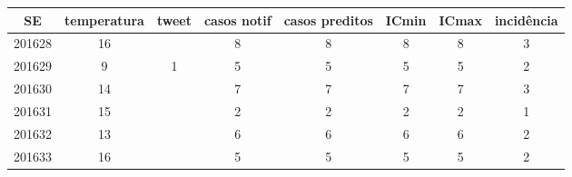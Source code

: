 \begin{tabular}{c|ccccccc}
  \hline
SE & temperatura & tweet & casos notif & casos preditos & ICmin & ICmax & incidência \\ 
  \hline
201628 & 16 &  & 8 & 8 & 8 & 8 & 3 \\ 
  201629 & 9 & 1 & 5 & 5 & 5 & 5 & 2 \\ 
  201630 & 14 &  & 7 & 7 & 7 & 7 & 3 \\ 
  201631 & 15 &  & 2 & 2 & 2 & 2 & 1 \\ 
  201632 & 13 &  & 6 & 6 & 6 & 6 & 2 \\ 
  201633 & 16 &  & 5 & 5 & 5 & 5 & 2 \\ 
   \hline
\end{tabular}
